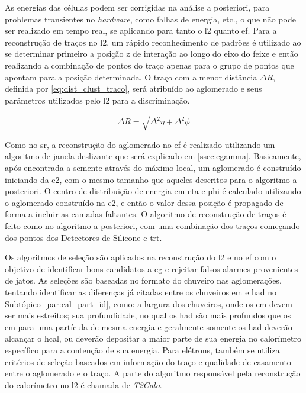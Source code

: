 As energias das células podem ser corrigidas na análise a posteriori, para
problemas transientes no \emph{hardware}, como falhas de energia, etc., o que não
pode ser realizado em tempo real, se aplicando para tanto o \gls{l2} quanto
\gls{ef}. Para a reconstrução de traços no \gls{l2}, um rápido reconhecimento de
padrões é utilizado ao se determinar primeiro a posição z de interação ao longo
do eixo do feixe e então realizando a combinação de pontos do traço apenas para o grupo
de pontos que apontam para a posição determinada. O traço com a menor distância
$\Delta R$, definida por \ref{eq:dist_clust_traco}, será atribuído ao
aglomerado e seus parâmetros utilizados pelo \gls{l2} para a discriminação.

\begin{equation}\label{eq:dist_clust_traco}
\Delta R = \sqrt{\Delta^2\eta+\Delta^2\phi}
\end{equation}

Como no \gls{sr}, a reconstrução do aglomerado no \gls{ef} é realizado
utilizando um algoritmo de janela deslizante que será
explicado em \ref{ssec:egamma}. Basicamente, após encontrada
a semente através do máximo local, um aglomerado é construído iniciando da \gls{e2},
com o mesmo tamanho que aqueles descritos para o algoritmo a posteriori. O
centro de distribuição de energia em \gls{eta} e \gls{phi} é calculado
utilizando o aglomerado construído na \gls{e2}, e então o valor dessa
posição é propagado de forma a incluir as camadas faltantes. O algoritmo
de reconstrução de traços é feito como no algoritmo a posteriori, com uma
combinação dos traços começando dos pontos dos Detectores de Silicone e
\gls{trt}.

Os algoritmos de seleção são aplicados na reconstrução do
\gls{l2} e no \gls{ef} com o objetivo de identificar bons candidatos a \gls{eg}
e rejeitar falsos alarmes provenientes de jatos. As seleções são baseadas no
formato do chuveiro nas aglomerações, tentando identificar as diferenças já
citadas entre os chuveiros \gls{em} e \gls{had} no
Subtópico~\ref{par:cal_part_id}, como: a largura dos chuveiros, onde os \gls{em}
devem ser mais estreitos; sua profundidade, no qual os \gls{had} são mais
profundos que os \gls{em} para uma partícula de mesma energia e geralmente
somente os \gls{had} deverão alcançar o \gls{hcal}, ou deverão
depositar a maior parte de sua energia no calorímetro específico para a
contenção de sua energia. Para elétrons, também se utiliza critérios de seleção 
baseados em informação do traço e qualidade de casamento entre o aglomerado e o
traço. A parte do algoritmo responsável pela reconstrução do calorímetro no
\gls{l2} é chamada de \emph{T2Calo}.

